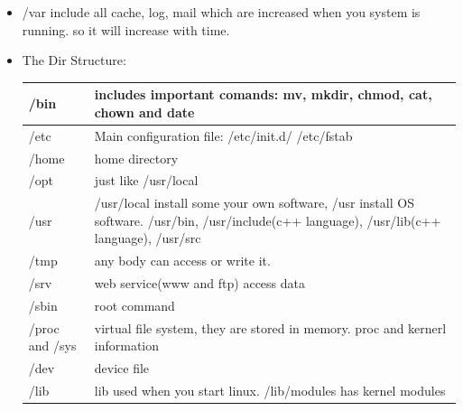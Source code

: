 \documentclass[a4paper,12pt,twoside]{book}
\begin{document}
\begin{itemize}
         \item /var include all cache, log, mail which are increased when you system is running. so it will increase with time. 
         
		 \item The Dir Structure:
\begin{center}
\begin{tabular}{p{}|p{}}
  \hline
  /bin & includes important comands: mv, mkdir, chmod, cat, chown and date  \\
 \hline  /etc & Main configuration file: /etc/init.d/ /etc/fstab \\
  \hline /home & home directory \\
  \hline /opt & just like /usr/local  \\
  \hline /usr & /usr/local install some your own software, /usr install OS software.  /usr/bin, /usr/include(c++ language), /usr/lib(c++ language),  /usr/src \\
  \hline /tmp & any body can access or write it.     \\
  \hline /srv & web service(www and ftp) access data \\
  \hline /sbin & root command \\
  \hline /proc and /sys & virtual file system, they are stored in memory.  proc and kernerl information \\
  \hline /dev & device file \\
  \hline /lib & lib used when you start linux. /lib/modules has kernel modules \\
  \hline 
\end{tabular} 
 \end{center}
\end{itemize} 
\end{document}
